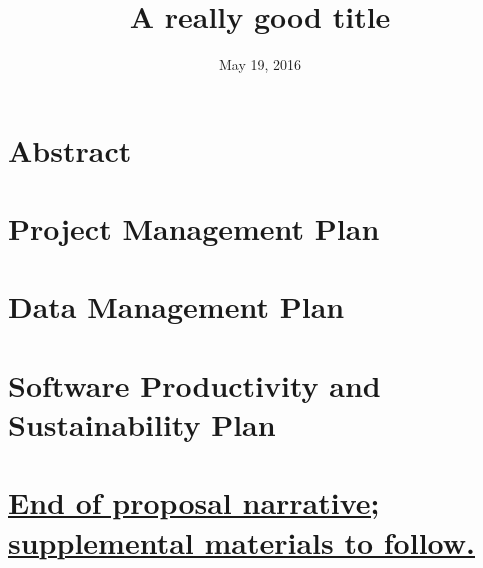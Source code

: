 \documentclass{DOEproposal}
\institute{Oak Ridge National Laboratory}
\title{A really good title}
\date{May 19, 2016}
\renewcommand*{\maketitle}{}
\begin{document}
    \maketitle

    \renewcommand{\contentsname}{Table of Contents}
    \tableofcontents
    \newpage

    \section*{\hfill Abstract \hfill}
    
    \newpage

    \setcounter{page}{1}

    
    
    
    
    \section{Project Management Plan}
        \label{sec:management}
        

    \section{Data Management Plan}
        \label{sec:data_management}
        

    \section{Software Productivity and Sustainability Plan}
        \label{sec:software_sustainability}
        


    \vspace{1em}
    \section*{\underline{End of proposal narrative; supplemental materials to follow.}}
    \newpage


\end{document}
